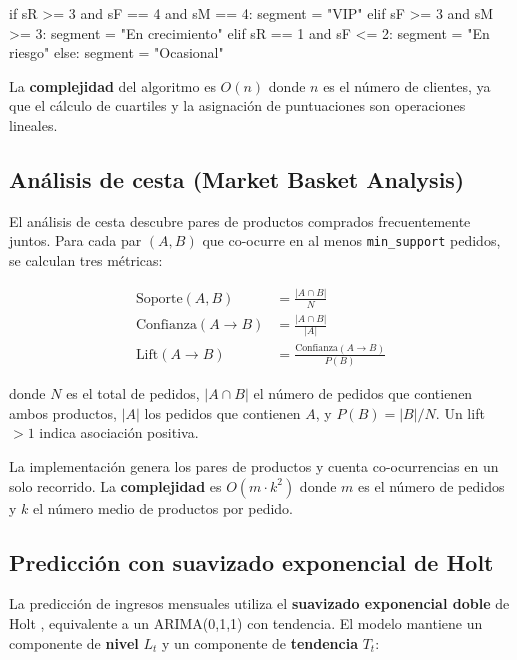 \documentclass[12pt,twoside,titlepage]{report}
\begin{document}
\begin{mypython}[caption={Asignación a segmentos RFM.},label={code:rfm}]
if   sR >= 3 and sF == 4 and sM == 4: segment = "VIP"
elif sF >= 3 and sM >= 3:             segment = "En crecimiento"
elif sR == 1 and sF <= 2:             segment = "En riesgo"
else:                                 segment = "Ocasional"
\end{mypython}

La \textbf{complejidad} del algoritmo es $O(n)$ donde $n$ es el número de clientes, ya que el cálculo de cuartiles y la asignación de puntuaciones son operaciones lineales.

\subsection{Análisis de cesta (Market Basket Analysis)}

El análisis de cesta \cite{agrawal1994} descubre pares de productos comprados frecuentemente juntos. Para cada par $(A, B)$ que co-ocurre en al menos \texttt{min\_support} pedidos, se calculan tres métricas:

\begin{align}
  \text{Soporte}(A, B) &= \frac{|A \cap B|}{N} \label{eq:soporte} \\
  \text{Confianza}(A \to B) &= \frac{|A \cap B|}{|A|} \label{eq:confianza} \\
  \text{Lift}(A \to B) &= \frac{\text{Confianza}(A \to B)}{P(B)} \label{eq:lift}
\end{align}

donde $N$ es el total de pedidos, $|A \cap B|$ el número de pedidos que contienen ambos productos, $|A|$ los pedidos que contienen $A$, y $P(B) = |B|/N$. Un lift $> 1$ indica asociación positiva.

La implementación genera los pares de productos y cuenta co-ocurrencias en un solo recorrido. La \textbf{complejidad} es $O(m \cdot k^2)$ donde $m$ es el número de pedidos y $k$ el número medio de productos por pedido.

\subsection{Predicción con suavizado exponencial de Holt}

La predicción de ingresos mensuales utiliza el \textbf{suavizado exponencial doble} de Holt \cite{holt1957}, equivalente a un ARIMA(0,1,1) con tendencia. El modelo mantiene un componente de \textbf{nivel} $L_t$ y un componente de \textbf{tendencia} $T_t$:
\end{document}
